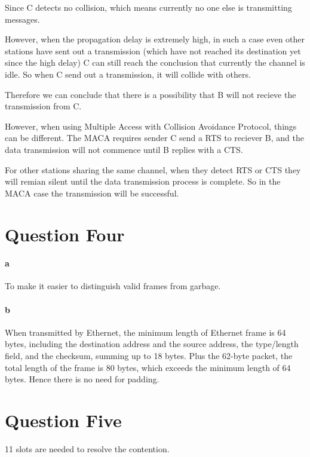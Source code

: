 \documentclass[paper=a4, fontsize=11pt]{scrartcl} %
\numberwithin{equation}{section} %
\numberwithin{figure}{section} %
\numberwithin{table}{section} %
\begin{document}
\vbox{  }
Since C detects no collision, which means currently no one else is transmitting messages.

\vbox{  }
However, when the propagation delay is extremely high, in such a case even other stations
have sent out a transmission (which have not reached its destination yet since the high delay)
 C can still reach the conclusion that currently the channel is idle. So when C send out a 
 transmission, it will collide with others.

 \vbox{ }
 Therefore we can conclude that there is a possibility that B will not recieve the transmission
  from C.

\vbox{ }
However, when using  Multiple Access with Collision Avoidance Protocol, things can
be different. The MACA requires sender C send a RTS to reciever B, and the data transmission will
not commence until B replies with a CTS.

\vbox{ }
For other stations sharing the same channel, when they detect RTS or CTS they will remian silent until
the data transmission process is complete. So in the MACA case the transmission will be successful.

\section{Question Four}
\paragraph{a} To make it easier to distinguish valid frames from garbage.
\paragraph{b} When transmitted by Ethernet, the minimum length of Ethernet frame is 
64 bytes, including the destination address and the source address, the type/length field,
and the checksum, summing up to 18 bytes. Plus the 62-byte packet, the total 
length of the frame is 80 bytes, which exceeds the minimum length of 64 bytes. Hence
there is no need for padding. 
\section{Question Five}
11 slots are needed to resolve the contention.
\end{document}
